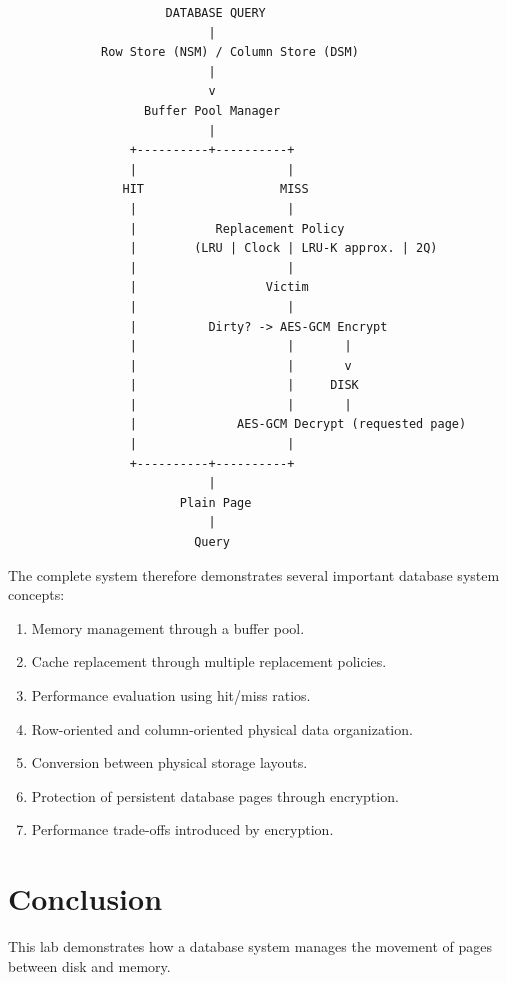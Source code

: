 \documentclass[12pt,a4paper]{article}
\begin{document}
\begin{verbatim}
                      DATABASE QUERY
                            |
             Row Store (NSM) / Column Store (DSM)
                            |
                            v
                   Buffer Pool Manager
                            |
                 +----------+----------+
                 |                     |
                HIT                   MISS
                 |                     |
                 |           Replacement Policy
                 |        (LRU | Clock | LRU-K approx. | 2Q)
                 |                     |
                 |                  Victim
                 |                     |
                 |          Dirty? -> AES-GCM Encrypt
                 |                     |       |
                 |                     |       v
                 |                     |     DISK
                 |                     |       |
                 |              AES-GCM Decrypt (requested page)
                 |                     |
                 +----------+----------+
                            |
                        Plain Page
                            |
                          Query
\end{verbatim}

The complete system therefore demonstrates several important database system concepts:

\begin{enumerate}
    \item Memory management through a buffer pool.
    \item Cache replacement through multiple replacement policies.
    \item Performance evaluation using hit/miss ratios.
    \item Row-oriented and column-oriented physical data organization.
    \item Conversion between physical storage layouts.
    \item Protection of persistent database pages through encryption.
    \item Performance trade-offs introduced by encryption.
\end{enumerate}

\section{Conclusion}

This lab demonstrates how a database system manages the movement of pages between disk and memory.
\end{document}
